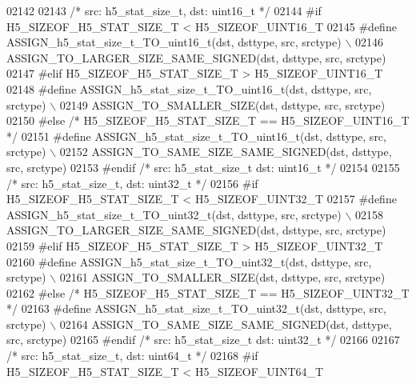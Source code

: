\begin{DoxyCode}
02142 
02143 \textcolor{comment}{/* src: h5\_stat\_size\_t, dst: uint16\_t */}
02144 \textcolor{preprocessor}{#if H5\_SIZEOF\_H5\_STAT\_SIZE\_T < H5\_SIZEOF\_UINT16\_T}
02145 \textcolor{preprocessor}{    #define ASSIGN\_h5\_stat\_size\_t\_TO\_uint16\_t(dst, dsttype, src, srctype) \(\backslash\)}
02146 \textcolor{preprocessor}{        ASSIGN\_TO\_LARGER\_SIZE\_SAME\_SIGNED(dst, dsttype, src, srctype)}
02147 \textcolor{preprocessor}{#elif H5\_SIZEOF\_H5\_STAT\_SIZE\_T > H5\_SIZEOF\_UINT16\_T}
02148 \textcolor{preprocessor}{    #define ASSIGN\_h5\_stat\_size\_t\_TO\_uint16\_t(dst, dsttype, src, srctype) \(\backslash\)}
02149 \textcolor{preprocessor}{        ASSIGN\_TO\_SMALLER\_SIZE(dst, dsttype, src, srctype)}
02150 \textcolor{preprocessor}{#else }\textcolor{comment}{/* H5\_SIZEOF\_H5\_STAT\_SIZE\_T == H5\_SIZEOF\_UINT16\_T */}\textcolor{preprocessor}{}
02151 \textcolor{preprocessor}{    #define ASSIGN\_h5\_stat\_size\_t\_TO\_uint16\_t(dst, dsttype, src, srctype) \(\backslash\)}
02152 \textcolor{preprocessor}{        ASSIGN\_TO\_SAME\_SIZE\_SAME\_SIGNED(dst, dsttype, src, srctype)}
02153 \textcolor{preprocessor}{#endif }\textcolor{comment}{/* src: h5\_stat\_size\_t dst: uint16\_t */}\textcolor{preprocessor}{}
02154 
02155 \textcolor{comment}{/* src: h5\_stat\_size\_t, dst: uint32\_t */}
02156 \textcolor{preprocessor}{#if H5\_SIZEOF\_H5\_STAT\_SIZE\_T < H5\_SIZEOF\_UINT32\_T}
02157 \textcolor{preprocessor}{    #define ASSIGN\_h5\_stat\_size\_t\_TO\_uint32\_t(dst, dsttype, src, srctype) \(\backslash\)}
02158 \textcolor{preprocessor}{        ASSIGN\_TO\_LARGER\_SIZE\_SAME\_SIGNED(dst, dsttype, src, srctype)}
02159 \textcolor{preprocessor}{#elif H5\_SIZEOF\_H5\_STAT\_SIZE\_T > H5\_SIZEOF\_UINT32\_T}
02160 \textcolor{preprocessor}{    #define ASSIGN\_h5\_stat\_size\_t\_TO\_uint32\_t(dst, dsttype, src, srctype) \(\backslash\)}
02161 \textcolor{preprocessor}{        ASSIGN\_TO\_SMALLER\_SIZE(dst, dsttype, src, srctype)}
02162 \textcolor{preprocessor}{#else }\textcolor{comment}{/* H5\_SIZEOF\_H5\_STAT\_SIZE\_T == H5\_SIZEOF\_UINT32\_T */}\textcolor{preprocessor}{}
02163 \textcolor{preprocessor}{    #define ASSIGN\_h5\_stat\_size\_t\_TO\_uint32\_t(dst, dsttype, src, srctype) \(\backslash\)}
02164 \textcolor{preprocessor}{        ASSIGN\_TO\_SAME\_SIZE\_SAME\_SIGNED(dst, dsttype, src, srctype)}
02165 \textcolor{preprocessor}{#endif }\textcolor{comment}{/* src: h5\_stat\_size\_t dst: uint32\_t */}\textcolor{preprocessor}{}
02166 
02167 \textcolor{comment}{/* src: h5\_stat\_size\_t, dst: uint64\_t */}
02168 \textcolor{preprocessor}{#if H5\_SIZEOF\_H5\_STAT\_SIZE\_T < H5\_SIZEOF\_UINT64\_T}

\end{DoxyCode}
